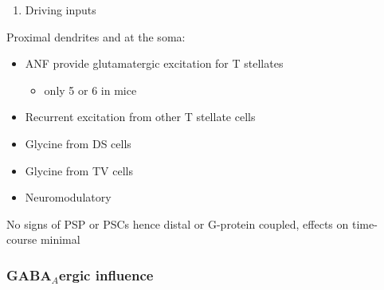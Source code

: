 \begin{enumerate}
\item Driving inputs
\end{enumerate}
Proximal dendrites and at the soma:

\begin{itemize}
\item ANF provide glutamatergic excitation for T stellates  \citep{Cant:1981,FerragamoGoldingEtAl:1998a,Alibardi:1998a}
\begin{itemize}
\item only 5 or 6 in mice \citep{FerragamoGoldingEtAl:1998a,CaoOertel:2010}
\end{itemize}
\item Recurrent excitation from other T stellate cells \citep{FerragamoGoldingEtAl:1998a}
\item Glycine from DS cells \citep{FerragamoGoldingEtAl:1998a}
\item Glycine from TV cells \citep{WickesbergOertel:1990,ZhangOertel:1993b}
\item Neuromodulatory
\end{itemize}
     No signs of PSP or PSCs hence distal or G-protein coupled, effects on time-course minimal
     
\subsubsection{GABA$_A$ergic influence}





